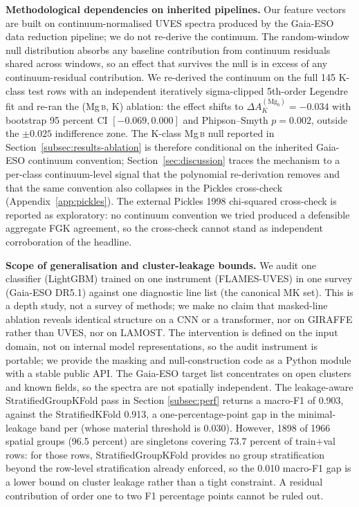 \documentclass[11pt,a4paper]{article}
\newcommand{\Mgb}{Mg\,\textsc{b}\xspace}
\newcommand{\dA}{\Delta A}
\begin{document}
\textbf{Methodological dependencies on inherited pipelines.} Our feature vectors are built on continuum-normalised UVES spectra produced by the Gaia-ESO data reduction pipeline; we do not re-derive the continuum. The random-window null distribution absorbs any baseline contribution from continuum residuals shared across windows, so an effect that survives the null is in excess of any continuum-residual contribution. We re-derived the continuum on the full 145 K-class test rows with an independent iteratively sigma-clipped 5th-order Legendre fit and re-ran the (\Mgb, K) ablation: the effect shifts to $\dA_K^{(\mathrm{Mg}_b)} = -0.034$ with bootstrap 95 percent CI $[-0.069, 0.000]$ and Phipson--Smyth $p = 0.002$, outside the $\pm 0.025$ indifference zone. The K-class \Mgb null reported in Section~\ref{subsec:results-ablation} is therefore conditional on the inherited Gaia-ESO continuum convention; Section~\ref{sec:discussion} traces the mechanism to a per-class continuum-level signal that the polynomial re-derivation removes and that the same convention also collapses in the Pickles cross-check (Appendix~\ref{app:pickles}). The external Pickles 1998 chi-squared cross-check is reported as exploratory: no continuum convention we tried produced a defensible aggregate FGK agreement, so the cross-check cannot stand as independent corroboration of the headline.

\textbf{Scope of generalisation and cluster-leakage bounds.} We audit one classifier (LightGBM) trained on one instrument (FLAMES-UVES) in one survey (Gaia-ESO DR5.1) against one diagnostic line list (the canonical MK set). This is a depth study, not a survey of methods; we make no claim that masked-line ablation reveals identical structure on a CNN or a transformer, nor on GIRAFFE rather than UVES, nor on LAMOST. The intervention is defined on the input domain, not on internal model representations, so the audit instrument is portable; we provide the masking and null-construction code as a Python module with a stable public API. The Gaia-ESO target list concentrates on open clusters and known fields, so the spectra are not spatially independent. The leakage-aware StratifiedGroupKFold pass in Section \ref{subsec:perf} returns a macro-F1 of 0.903, against the StratifiedKFold 0.913, a one-percentage-point gap in the minimal-leakage band per \citet{2019MNRAS.486.2075B} (whose material threshold is 0.030). However, 1898 of 1966 spatial groups (96.5 percent) are singletons covering 73.7 percent of train$+$val rows: for those rows, StratifiedGroupKFold provides no group stratification beyond the row-level stratification already enforced, so the 0.010 macro-F1 gap is a lower bound on cluster leakage rather than a tight constraint. A residual contribution of order one to two F1 percentage points cannot be ruled out.
\end{document}
